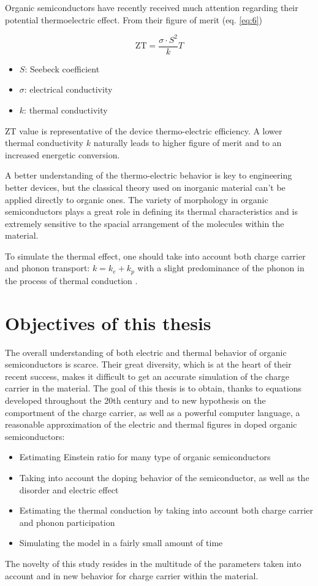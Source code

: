 Organic semiconductors have recently received much attention regarding their potential thermoelectric effect. From their figure of merit (eq. \ref{eq:6})

\begin{equation}
    \mathrm{ZT}=\frac{\sigma \cdot S^{2}}{k} T
    \label{eq:6}
\end{equation}

\begin{itemize}
    \item $S$: Seebeck coefficient
    \item $\sigma$: electrical conductivity
    \item $k$: thermal conductivity
\end{itemize}

ZT value is representative of the device thermo-electric efficiency. A lower thermal conductivity $k$ naturally leads to higher figure of merit and to an increased energetic conversion.

A better understanding of the thermo-electric behavior is key to engineering better devices, but the classical theory used on inorganic material \cite{einstein_model_thermic} can't be applied directly to organic ones. The variety of morphology in organic semiconductors plays a great role in defining its thermal characteristics and is extremely sensitive to the spacial arrangement of the molecules within the material.

To simulate the thermal effect, one should take into account both charge carrier and phonon transport: $k = k_e + k_p$ with a slight predominance of the phonon in the process of thermal conduction \cite{universal_einstein}.

\section{Objectives of this thesis}

The overall understanding of both electric and thermal behavior of organic semiconductors is scarce. Their great diversity, which is at the heart of their recent success, makes it difficult to get an accurate simulation of the charge carrier in the material. The goal of this thesis is to obtain, thanks to equations developed throughout the 20th century and to new hypothesis on the comportment of the charge carrier, as well as a powerful computer language, a reasonable approximation of the electric and thermal figures in doped organic semiconductors:

\begin{itemize}
    \item Estimating Einstein ratio for many type of organic semiconductors
    \item Taking into account the doping behavior of the semiconductor, as well as the disorder and electric effect
    \item Estimating the thermal conduction by taking into account both charge carrier and phonon participation
    \item Simulating the model in a fairly small amount of time
\end{itemize}

The novelty of this study resides in the multitude of the parameters taken into account and in new behavior for charge carrier within the material.
